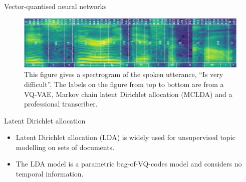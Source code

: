 \documentclass[final]{beamer}
\begin{document}
\begin{frame}[t]
\begin{columns}[T]
\begin{column}{.33\linewidth}
\begin{minipage}[T]{.97\textwidth}
{\begin{block}{Vector-quantised neural networks}
                        \begin{figure}[t]\label{fig:aud_example}
                            \centering
                            \includegraphics[width=\linewidth]{figures/aud_example}
                            \caption[Acoustic unit discovery of an utterance]{
                                This figure gives a spectrogram of the spoken utterance, ``Is very difficult''.
                                The labels on the figure from top to bottom are from a VQ-VAE, Markov chain latent Dirichlet allocation (MCLDA) and a professional transcriber.}
                        \end{figure}

                    \end{block}

                    \begin{block}{Latent Dirichlet allocation}

                        \begin{itemize}
                            \vspace{-0.5cm}
                            \setlength{\itemsep}{0.5ex}
                            \item Latent Dirichlet allocation (LDA) is widely used for unsupervised topic modelling on sets of documents.
                            \item The LDA model is a parametric bag-of-VQ-codes model and considers no temporal information. 
                        \end{itemize}


\end{block}}
\end{minipage}
\end{column}
\end{columns}
\end{frame}
\end{document}
